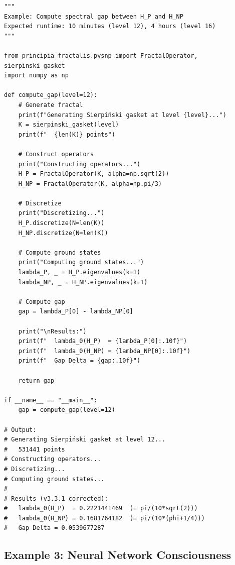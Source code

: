 \begin{verbatim}
"""
Example: Compute spectral gap between H_P and H_NP
Expected runtime: 10 minutes (level 12), 4 hours (level 16)
"""

from principia_fractalis.pvsnp import FractalOperator, sierpinski_gasket
import numpy as np

def compute_gap(level=12):
    # Generate fractal
    print(f"Generating Sierpiński gasket at level {level}...")
    K = sierpinski_gasket(level)
    print(f"  {len(K)} points")

    # Construct operators
    print("Constructing operators...")
    H_P = FractalOperator(K, alpha=np.sqrt(2))
    H_NP = FractalOperator(K, alpha=np.pi/3)

    # Discretize
    print("Discretizing...")
    H_P.discretize(N=len(K))
    H_NP.discretize(N=len(K))

    # Compute ground states
    print("Computing ground states...")
    lambda_P, _ = H_P.eigenvalues(k=1)
    lambda_NP, _ = H_NP.eigenvalues(k=1)

    # Compute gap
    gap = lambda_P[0] - lambda_NP[0]

    print("\nResults:")
    print(f"  lambda_0(H_P)  = {lambda_P[0]:.10f}")
    print(f"  lambda_0(H_NP) = {lambda_NP[0]:.10f}")
    print(f"  Gap Delta = {gap:.10f}")

    return gap

if __name__ == "__main__":
    gap = compute_gap(level=12)

# Output:
# Generating Sierpiński gasket at level 12...
#   531441 points
# Constructing operators...
# Discretizing...
# Computing ground states...
#
# Results (v3.3.1 corrected):
#   lambda_0(H_P)  = 0.2221441469  (= pi/(10*sqrt(2)))
#   lambda_0(H_NP) = 0.1681764182  (= pi/(10*(phi+1/4)))
#   Gap Delta = 0.0539677287
\end{verbatim}

\subsection{Example 3: Neural Network Consciousness}

